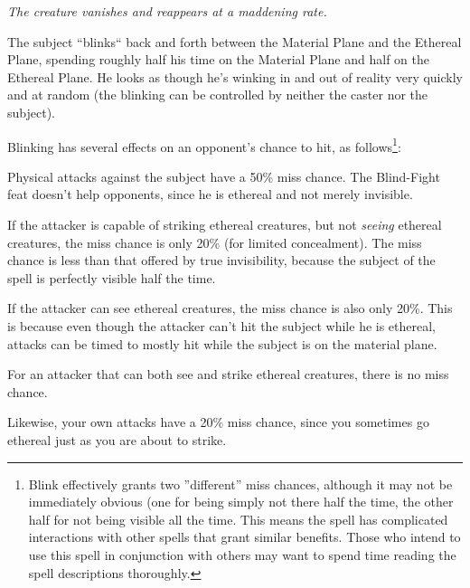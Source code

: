 \emph{The creature vanishes and reappears at a maddening rate.}

The subject ``blinks`` back and forth between the Material Plane and the Ethereal Plane, spending
roughly half his time on the Material Plane and half on the Ethereal Plane. 
He looks as though he's winking in and out of reality very quickly and at random
(the blinking can be controlled by neither the caster nor the subject).

Blinking has several effects on an opponent's chance to hit, as follows\footnote{
Blink effectively grants two ''different'' miss chances, although it may not be immediately obvious
(one for being simply not there half the time, the other half for not being visible all the time.
This means the spell has complicated interactions with other spells that grant similar benefits. 
Those who intend to use this spell in conjunction with others may want to spend time reading the spell descriptions thoroughly.
}:

\begin{list}{}{\leftmargin=1em}
 \item Physical attacks against the subject have a 50\% miss chance. 
 The Blind-Fight feat doesn't help opponents, since he is ethereal and not merely invisible.
 \item If the attacker is capable of striking ethereal creatures, but not \emph{seeing}
 ethereal creatures, the miss chance is only 20\% (for limited concealment).
 The miss chance is less than that offered by true invisibility, because the subject of the spell
 is perfectly visible half the time.
 \item If the attacker can see ethereal creatures, the miss chance is also only 20\%.
 This is because even though the attacker can't hit the subject while he is ethereal, 
 attacks can be timed to mostly hit while the subject is on the material plane.
 \item For an attacker that can both see and strike ethereal creatures, there is no miss chance.
\end{list}  
Likewise, your own attacks have a 20\% miss chance, 
since you sometimes go ethereal just as you are about to strike.

